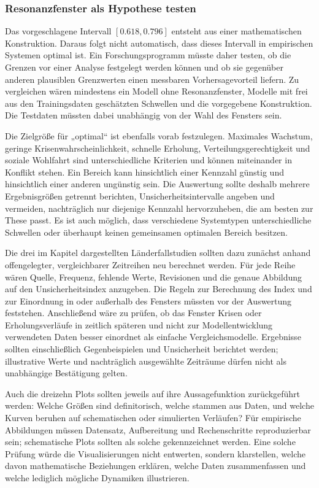 \documentclass[a4paper,12pt,twoside]{report}
\theoremstyle{definition}
\begin{document}
\subsubsection{Resonanzfenster als Hypothese testen}

Das vorgeschlagene Intervall $[0.618,0.796]$ entsteht aus einer mathematischen Konstruktion. Daraus folgt nicht automatisch, dass dieses Intervall in empirischen Systemen optimal ist. Ein Forschungsprogramm müsste daher testen, ob die Grenzen vor einer Analyse festgelegt werden können und ob sie gegenüber anderen plausiblen Grenzwerten einen messbaren Vorhersagevorteil liefern. Zu vergleichen wären mindestens ein Modell ohne Resonanzfenster, Modelle mit frei aus den Trainingsdaten geschätzten Schwellen und die vorgegebene Konstruktion. Die Testdaten müssten dabei unabhängig von der Wahl des Fensters sein.

Die Zielgröße für „optimal“ ist ebenfalls vorab festzulegen. Maximales Wachstum, geringe Krisenwahrscheinlichkeit, schnelle Erholung, Verteilungsgerechtigkeit und soziale Wohlfahrt sind unterschiedliche Kriterien und können miteinander in Konflikt stehen. Ein Bereich kann hinsichtlich einer Kennzahl günstig und hinsichtlich einer anderen ungünstig sein. Die Auswertung sollte deshalb mehrere Ergebnisgrößen getrennt berichten, Unsicherheitsintervalle angeben und vermeiden, nachträglich nur diejenige Kennzahl hervorzuheben, die am besten zur These passt. Es ist auch möglich, dass verschiedene Systemtypen unterschiedliche Schwellen oder überhaupt keinen gemeinsamen optimalen Bereich besitzen.

Die drei im Kapitel dargestellten Länderfallstudien sollten dazu zunächst anhand offengelegter, vergleichbarer Zeitreihen neu berechnet werden. Für jede Reihe wären Quelle, Frequenz, fehlende Werte, Revisionen und die genaue Abbildung auf den Unsicherheitsindex anzugeben. Die Regeln zur Berechnung des Index und zur Einordnung in oder außerhalb des Fensters müssten vor der Auswertung feststehen. Anschließend wäre zu prüfen, ob das Fenster Krisen oder Erholungsverläufe in zeitlich späteren und nicht zur Modellentwicklung verwendeten Daten besser einordnet als einfache Vergleichsmodelle. Ergebnisse sollten einschließlich Gegenbeispielen und Unsicherheit berichtet werden; illustrative Werte und nachträglich ausgewählte Zeiträume dürfen nicht als unabhängige Bestätigung gelten.

Auch die dreizehn Plots sollten jeweils auf ihre Aussagefunktion zurückgeführt werden: Welche Größen sind definitorisch, welche stammen aus Daten, und welche Kurven beruhen auf schematischen oder simulierten Verläufen? Für empirische Abbildungen müssen Datensatz, Aufbereitung und Rechenschritte reproduzierbar sein; schematische Plots sollten als solche gekennzeichnet werden. Eine solche Prüfung würde die Visualisierungen nicht entwerten, sondern klarstellen, welche davon mathematische Beziehungen erklären, welche Daten zusammenfassen und welche lediglich mögliche Dynamiken illustrieren.
\end{document}
